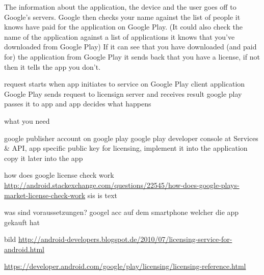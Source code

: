 The information about the application, the device and the user goes off to Google's servers.
Google then checks your name against the list of people it knows have paid for the application on Google Play. (It could also check the name of the application against a list of applications it knows that you've downloaded from Google Play)
If it can see that you have downloaded (and paid for) the application from Google Play it sends back that you have a license, if not then it tells the app you don't.

%
request starts when app initiates to service on Google Play client application
Google Play sends request to licensign server and receives result
google play passes it to app and app decides what happens
\cite{developersLicensingOverview}
%

%
what you need

google publisher account on google play
google play developer console at Services \& API, app specific public key for licensing, implement it into the application
copy it later into the app


how does google license check work \url{http://android.stackexchange.com/questions/22545/how-does-google-plays-market-license-check-work}\newline
sis is text

was sind voraussetzungen? googel acc auf dem smartphone welcher die app gekauft hat\newline

bild \url{http://android-developers.blogspot.de/2010/07/licensing-service-for-android.html}

\url{https://developer.android.com/google/play/licensing/licensing-reference.html}
